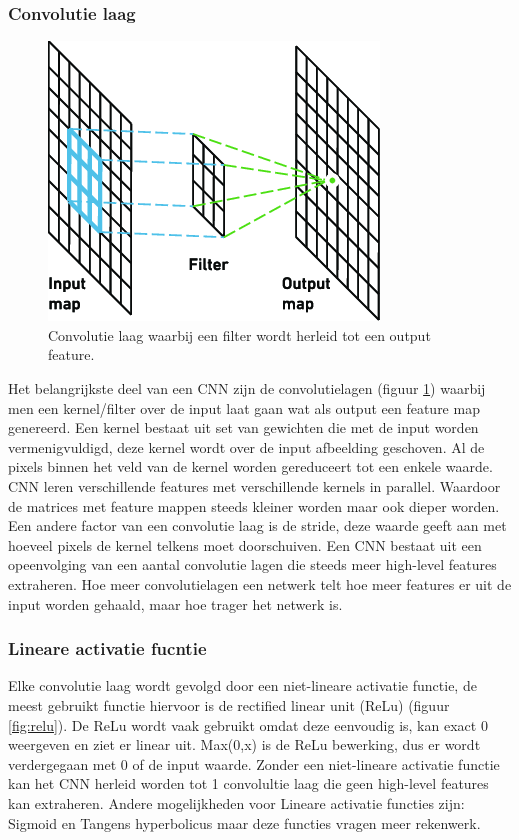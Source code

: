 \subsubsection{Convolutie laag}
\begin{figure}[!ht]
 	\centering
 	\includegraphics[width=0.35\linewidth]{fig/convolution layer.png}
 	\caption{Convolutie laag waarbij een filter wordt herleid tot een output feature.}
 	\label{fig:conv_laag}
\end{figure}
 
Het belangrijkste deel van een CNN zijn de convolutielagen (figuur \ref{fig:conv_laag}) waarbij men een kernel/filter over de input laat gaan wat als output een feature map genereerd. Een kernel bestaat uit set van gewichten die met de input worden vermenigvuldigd, deze kernel wordt over de input afbeelding geschoven. Al de pixels binnen het veld van de kernel worden gereduceert tot een enkele waarde. CNN leren verschillende features met verschillende kernels in parallel. Waardoor de matrices met feature mappen steeds kleiner worden maar ook dieper worden. Een andere factor van een convolutie laag is de stride, deze waarde geeft aan met hoeveel pixels de kernel telkens moet doorschuiven. Een CNN bestaat uit een opeenvolging van een aantal convolutie lagen die steeds meer high-level features extraheren. Hoe meer convolutielagen een netwerk telt hoe meer features er uit de input worden gehaald, maar hoe trager het netwerk is. 

\subsubsection{Lineare activatie fucntie}
Elke convolutie laag wordt gevolgd door een niet-lineare activatie functie, de meest gebruikt functie hiervoor is de rectified linear unit (ReLu) (figuur \ref{fig:relu}). De ReLu wordt vaak gebruikt omdat deze eenvoudig is, kan exact 0 weergeven en ziet er linear uit. Max(0,x) is de ReLu bewerking, dus er wordt verdergegaan met 0 of de input waarde. Zonder een niet-lineare activatie functie kan het CNN herleid worden tot 1 convolultie laag die geen high-level features kan extraheren. Andere mogelijkheden voor Lineare activatie functies zijn: Sigmoid en Tangens hyperbolicus maar deze functies vragen meer rekenwerk.

